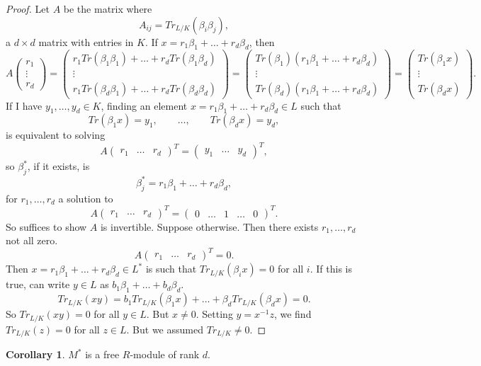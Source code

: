\documentclass{article}
\newcommand{\rb}[1]{\left( #1 \right)}
\newcommand{\three}[3]{\begin{pmatrix} #1 & #2 & #3 \end{pmatrix}}
\theoremstyle{definition}\newtheorem{definition}{Definition}[subsection]
\theoremstyle{definition}\newtheorem{remark}[definition]{Remark}
\theoremstyle{definition}\newtheorem*{example}{Example}
\theoremstyle{definition}\newtheorem*{note}{Note}
\newtheorem{corollary}[definition]{Corollary}
\begin{document}
\begin{proof}
Let $ A $ be the matrix where
$$ A_{ij} = Tr_{L / K}\rb{\beta_i\beta_j}, $$
a $ d \times d $ matrix with entries in $ K $. If $ x = r_1\beta_1 + \dots + r_d\beta_d $, then
$$ A\begin{pmatrix}
r_1 \\
\vdots \\
r_d
\end{pmatrix} = \begin{pmatrix}
r_1Tr\rb{\beta_1\beta_1} + \dots + r_dTr\rb{\beta_1\beta_d} \\
\vdots \\
r_1Tr\rb{\beta_d\beta_1} + \dots + r_dTr\rb{\beta_d\beta_d}
\end{pmatrix} = \begin{pmatrix}
Tr\rb{\beta_1}\rb{r_1\beta_1 + \dots + r_d\beta_d} \\
\vdots \\
Tr\rb{\beta_d}\rb{r_1\beta_1 + \dots + r_d\beta_d}
\end{pmatrix} = \begin{pmatrix}
Tr\rb{\beta_1x} \\
\vdots \\
Tr\rb{\beta_dx}
\end{pmatrix}. $$
If I have $ y_1, \dots, y_d \in K $, finding an element $ x = r_1\beta_1 + \dots + r_d\beta_d \in L $ such that
$$ Tr\rb{\beta_1x} = y_1, \qquad \dots, \qquad Tr\rb{\beta_dx} = y_d, $$
is equivalent to solving
$$ A\three{r_1}{\dots}{r_d}^T = \three{y_1}{\dots}{y_d}^T, $$
so $ \beta_j^* $, if it exists, is
$$ \beta_j^* = r_1\beta_1 + \dots + r_d\beta_d, $$
for $ r_1, \dots, r_d $ a solution to
$$ A\three{r_1}{\dots}{r_d}^T = \three{0}{\dots & 1 & \dots}{0}^T. $$
So suffices to show $ A $ is invertible. Suppose otherwise. Then there exists $ r_1, \dots, r_d $ not all zero.
$$ A\three{r_1}{\dots}{r_d}^T = 0. $$
Then $ x = r_1\beta_1 + \dots + r_d\beta_d \in L^* $ is such that $ Tr_{L / K}\rb{\beta_ix} = 0 $ for all $ i $. If this is true, can write $ y \in L $ as $ b_1\beta_1 + \dots + b_d\beta_d $.
$$ Tr_{L / K}\rb{xy} = b_1Tr_{L / K}\rb{\beta_1x} + \dots + \beta_dTr_{L / K}\rb{\beta_dx} = 0. $$
So $ Tr_{L / K}\rb{xy} = 0 $ for all $ y \in L $. But $ x \ne 0 $. Setting $ y = x^{-1}z $, we find $ Tr_{L / K}\rb{z} = 0 $ for all $ z \in L $. But we assumed $ Tr_{L / K} \ne 0 $.
\end{proof}

\begin{corollary}
$ M^* $ is a free $ R $-module of rank $ d $.
\end{corollary}
\end{document}
